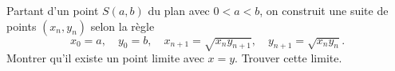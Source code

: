 Partant d'un point $S(a, b)$ du plan avec $0 < a < b$, on construit une suite de points $(x_n, y_n)$ selon la règle
\[ x_0 = a,\quad y_0 = b,\quad x_{n+1} = \sqrt{x_ny_{n+1}},\quad y_{n+1} = \sqrt{x_ny_n}. \]
Montrer qu'il existe un point limite avec $x = y$. Trouver cette limite.
